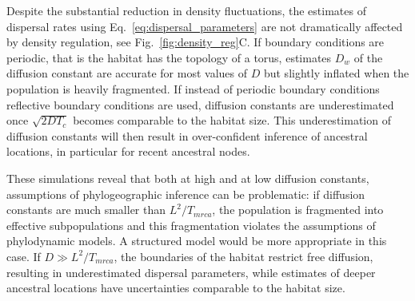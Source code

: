 \documentclass[aps,rmp, twocolumn]{revtex4}
\begin{document}
Despite the substantial reduction in density fluctuations, the estimates of dispersal rates using Eq.~\ref{eq:dispersal_parameters} are not dramatically affected by density regulation, see Fig.~\ref{fig:density_reg}C.
If boundary conditions are periodic, that is the habitat has the topology of a torus, estimates $D_w$ of the diffusion constant are accurate for most values of $D$ but slightly inflated when the population is heavily fragmented.
If instead of periodic boundary conditions reflective boundary conditions are used, diffusion constants are underestimated once $\sqrt{2DT_c}$ becomes comparable to the habitat size.
This underestimation of diffusion constants will then result in over-confident inference of ancestral locations, in particular for recent ancestral nodes.

These simulations reveal that both at high and at low diffusion constants, assumptions of phylogeographic inference can be problematic: if diffusion constants are much smaller than $L^2/T_{mrca}$, the population is fragmented into effective subpopulations and this fragmentation violates the assumptions of phylodynamic models.
A structured model would be more appropriate in this case.
If $D\gg L^2/T_{mrca}$, the boundaries of the habitat restrict free diffusion, resulting in underestimated dispersal parameters, while estimates of deeper ancestral locations have uncertainties comparable to the habitat size.
\end{document}
